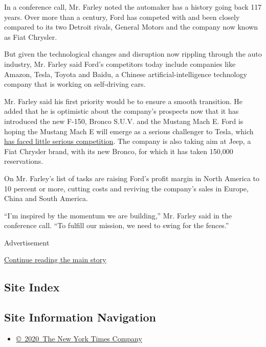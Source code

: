 In a conference call, Mr. Farley noted the automaker has a history going
back 117 years. Over more than a century, Ford has competed with and
been closely compared to its two Detroit rivals, General Motors and the
company now known as Fiat Chrysler.

But given the technological changes and disruption now rippling through
the auto industry, Mr. Farley said Ford's competitors today include
companies like Amazon, Tesla, Toyota and Baidu, a Chinese
artificial-intelligence technology company that is working on
self-driving cars.

Mr. Farley said his first priority would be to ensure a smooth
transition. He added that he is optimistic about the company's prospects
now that it has introduced the new F-150, Bronco S.U.V. and the Mustang
Mach E. Ford is hoping the Mustang Mach E will emerge as a serious
challenger to Tesla, which
\href{https://www.nytimes.com/2020/07/22/business/tesla-electric-car-audi-polestar.html}{has
faced little serious competition}. The company is also taking aim at
Jeep, a Fiat Chrysler brand, with its new Bronco, for which it has taken
150,000 reservations.

On Mr. Farley's list of tasks are raising Ford's profit margin in North
America to 10 percent or more, cutting costs and reviving the company's
sales in Europe, China and South America.

``I'm inspired by the momentum we are building,'' Mr. Farley said in the
conference call. ``To fulfill our mission, we need to swing for the
fences.''

Advertisement

\protect\hyperlink{after-bottom}{Continue reading the main story}

\hypertarget{site-index}{%
\subsection{Site Index}\label{site-index}}

\hypertarget{site-information-navigation}{%
\subsection{Site Information
Navigation}\label{site-information-navigation}}

\begin{itemize}
\tightlist
\item
  \href{https://help.nytimes.com/hc/en-us/articles/115014792127-Copyright-notice}{©~2020~The
  New York Times Company}
\end{itemize}

